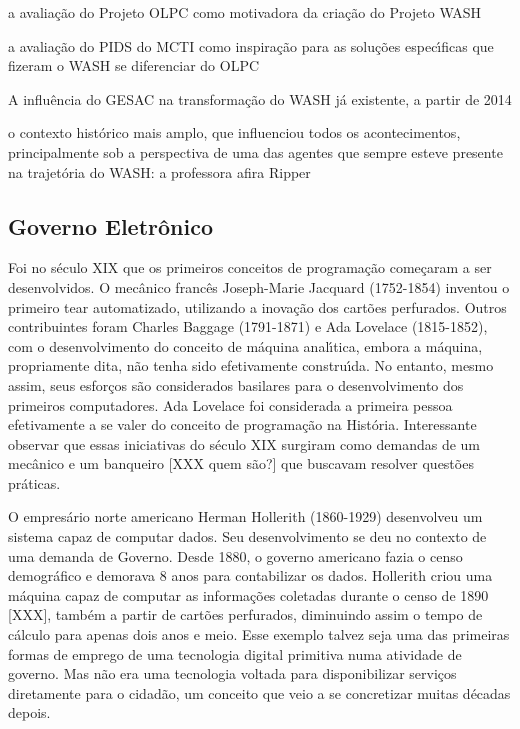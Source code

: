 \documentclass[
12pt,		%
openright,	%
twoside,  %
a4paper,			%
chapter=TITLE,		%
english,			%
french,				%
spanish,			%
brazil				%
]{USPSC-classe/USPSC_RedarTex}
\begin{document}
\begin{alineas}
\item a avalia\c{c}\~ao do Projeto OLPC como motivadora da cria\c{c}\~ao do Projeto WASH
\item a avalia\c{c}\~ao do PIDS do MCTI como inspira\c{c}\~ao para as solu\c{c}\~oes espec\'{\i}ficas que fizeram o WASH se diferenciar do OLPC
\item A influ\^encia do GESAC na transforma\c{c}\~ao do WASH j\'a existente, a partir de 2014
\item o contexto hist\'orico mais amplo, que influenciou todos os acontecimentos, principalmente sob a perspectiva de uma das agentes que sempre esteve presente na trajet\'oria do WASH: a professora afira Ripper
\end{alineas}

\subsection[Governo Eletr\^onico]{Governo Eletr\^onico}\label{Governo Eletr\^onico}
Foi no s\'eculo XIX que os primeiros conceitos de programa\c{c}\~ao come\c{c}aram a ser desenvolvidos. O mec\^anico franc\^es Joseph-Marie Jacquard (1752-1854) inventou o primeiro tear automatizado, utilizando a inova\c{c}\~ao dos cart\~oes perfurados. Outros contribuintes foram Charles Baggage (1791-1871) e Ada Lovelace (1815-1852), com o desenvolvimento do conceito de m\'aquina anal\'{\i}tica, embora a m\'aquina, propriamente dita, n\~ao tenha sido efetivamente constru\'{\i}da. No entanto, mesmo assim, seus esfor\c{c}os s\~ao considerados basilares para o desenvolvimento dos primeiros computadores. Ada Lovelace foi considerada a primeira pessoa efetivamente a se valer do conceito de programa\c{c}\~ao na Hist\'oria. Interessante observar que essas iniciativas do s\'eculo XIX surgiram como demandas de um mec\^anico e um banqueiro [XXX quem s\~ao?] que buscavam resolver quest\~oes pr\'aticas.










O empres\'ario norte americano Herman Hollerith (1860-1929) desenvolveu um sistema capaz de computar dados. Seu desenvolvimento se deu no contexto de uma demanda de Governo. Desde 1880, o governo americano fazia o censo demogr\'afico e demorava 8 anos para contabilizar os dados. Hollerith criou uma m\'aquina capaz de computar as informa\c{c}\~oes coletadas durante o censo de 1890 [XXX], tamb\'em a partir de cart\~oes perfurados, diminuindo assim o tempo de c\'alculo para apenas dois anos e meio. Esse exemplo talvez seja uma das primeiras formas de emprego de uma tecnologia digital primitiva numa atividade de governo. Mas n\~ao era uma tecnologia voltada para disponibilizar servi\c{c}os diretamente para o cidad\~ao, um conceito que veio a se concretizar muitas d\'ecadas depois.
\end{document}
